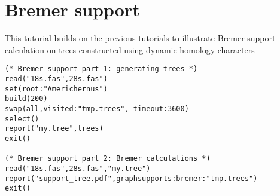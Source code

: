 




\section{Bremer support}{\label{tutorial4}}

This tutorial builds on the previous tutorials to illustrate Bremer support 
calculation on trees constructed using dynamic homology characters
    
   \begin{verbatim}
(* Bremer support part 1: generating trees *)
read("18s.fas",28s.fas")
set(root:"Americhernus")
build(200)
swap(all,visited:"tmp.trees", timeout:3600)
select()
report("my.tree",trees)
exit()

(* Bremer support part 2: Bremer calculations *)
read("18s.fas",28s.fas","my.tree")
report("support_tree.pdf",graphsupports:bremer:"tmp.trees")
exit()
\end{verbatim}

